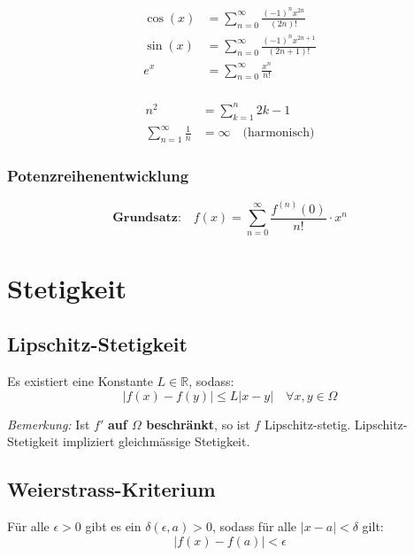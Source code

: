\documentclass[11pt]{article}
\begin{document}
\begin{minipage}[c]{0.5\textwidth}
\begin{equation*}
\begin{split}
	\cos(x) & = \sum^\infty_{n =0}\frac{(-1)^nx^{2n}}{(2n)!} \\
	\sin(x) & = \sum^\infty_{n =0}\frac{(-1)^nx^{2n+1}}{(2n+1)!} \\
	e^x & = \sum^\infty_{n =0}\frac{x^n}{n!} \\
\end{split}
\end{equation*}

\end{minipage}
%
\begin{minipage}[c]{0.5\textwidth}
\begin{equation*}
\begin{split}
	n^2 & = \sum_{k=1}^n 2k-1\\
	\sum_{n=1}^{\infty}\frac{1}{n} & = \infty\quad\text{(harmonisch)}
\end{split}
\end{equation*}
\end{minipage}

\subsubsection{Potenzreihenentwicklung}

\begin{equation*}
	\textbf{Grundsatz:} \quad f(x) = \sum_{n=0}^\infty \frac{f^{(n)}(0)}{n!} \cdot x^n
\end{equation*}

\section{Stetigkeit}

\subsection{Lipschitz-Stetigkeit}
Es existiert eine Konstante $L\in \mathbb{R}$, sodass:
\begin{equation*}
	|f(x)-f(y)|\leq L|x-y| \quad \forall x,y \in \Omega
\end{equation*}

\emph{Bemerkung:} Ist $f'$ \textbf{auf $\Omega$ beschr{\"a}nkt}, so ist $f$ Lipschitz-stetig. Lipschitz-Stetigkeit impliziert gleichm{\"a}ssige Stetigkeit.

\subsection{Weierstrass-Kriterium}
F{\"u}r alle $\epsilon > 0$ gibt es ein $\delta(\epsilon, a) >0$, sodass f{\"u}r alle $|x-a|<\delta$ gilt:
\begin{equation*}
	|f(x) -f(a)|<\epsilon
\end{equation*}
\end{document}
